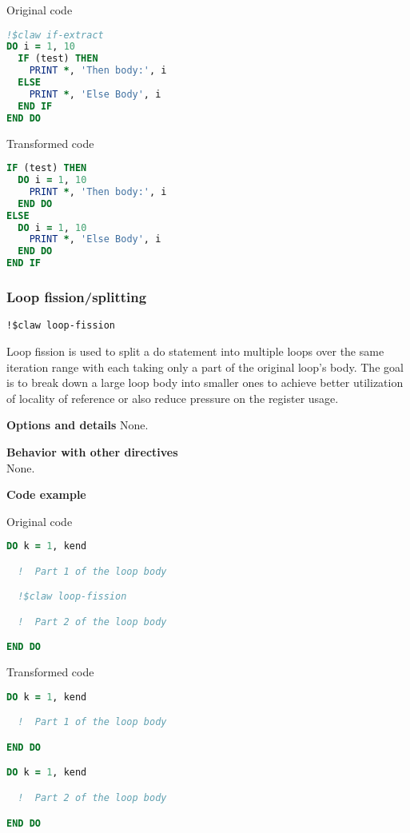 Original code
\begin{lstlisting}[language=Fortran]
!$claw if-extract
DO i = 1, 10
  IF (test) THEN
    PRINT *, 'Then body:', i
  ELSE
    PRINT *, 'Else Body', i
  END IF
END DO
\end{lstlisting}

Transformed code
\begin{lstlisting}[language=Fortran]
IF (test) THEN
  DO i = 1, 10
    PRINT *, 'Then body:', i
  END DO
ELSE
  DO i = 1, 10
    PRINT *, 'Else Body', i
  END DO
END IF
\end{lstlisting}


%
%
\subsubsection{Loop fission/splitting}
\begin{lstlisting}
!$claw loop-fission
\end{lstlisting}

Loop fission is used to split a do statement into multiple loops over the same 
iteration range with each taking only a part of the original loop's body. 
The goal is to break down a large loop body into smaller ones to achieve 
better utilization of locality of reference or also reduce pressure on 
the register usage.

\textbf{Options and details}
None.

\textbf{Behavior with other directives}\\
None.

\textbf{Code example}\\\label{loop-fission1}

Original code
\begin{lstlisting}[language=Fortran]
DO k = 1, kend

  !  Part 1 of the loop body 

  !$claw loop-fission

  !  Part 2 of the loop body 

END DO
\end{lstlisting}

Transformed code
\begin{lstlisting}[language=Fortran]
DO k = 1, kend

  !  Part 1 of the loop body 

END DO

DO k = 1, kend

  !  Part 2 of the loop body 

END DO
\end{lstlisting}
